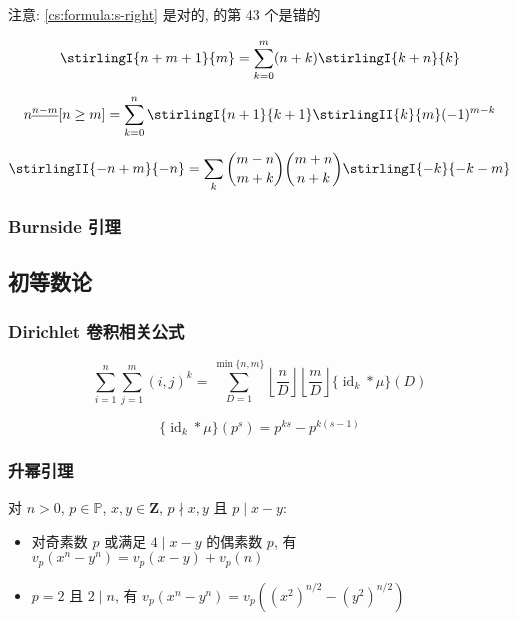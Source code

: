 注意: \eqref{cs:formula:s-right} 是对的,  的第 43 个是错的

\begin{equation}
    \label{cs:formula:s-right}
    \stirlingI{n+m+1}{m}=\sum_{k=0}^m(n+k)\stirlingI{k+n}{k}
\end{equation}

\begin{equation}
    n^{\underline{n-m}}[n\geq m]=\sum_{k=0}^n\stirlingI{n+1}{k+1}\stirlingII{k}{m}(-1)^{m-k}
\end{equation}

\begin{equation}
    \stirlingII{-n+m}{-n}=\sum_k\binom{m-n}{m+k}\binom{m+n}{n+k}\stirlingI{-k}{-k-m}
\end{equation}

\subsubsection{Burnside 引理}


\subsection{初等数论}

\subsubsection{Dirichlet 卷积相关公式}

\begin{equation}
    \sum_{i=1}^n\sum_{j=1}^m(i,j)^k=\sum_{D=1}^{\min\{n,m\}}\left\lfloor\frac{n}{D}\right\rfloor\left\lfloor\frac{m}{D}\right\rfloor\{\operatorname{id}_k*\mu\}(D)
\end{equation}

\begin{equation}
    \{\operatorname{id}_k*\mu\}(p^s)=p^{ks}-p^{k(s-1)}
\end{equation}

\subsubsection{升幂引理}

对 \(n>0\), \(p\in\mathbb{P}\), \(x,y\in\mathbf{Z}\), \(p\nmid x,y\) 且 \(p\mid x-y\):

\begin{itemize}
    \item 对奇素数 \(p\) 或满足 \(4\mid x-y\) 的偶素数 \(p\), 有 \(v_p\left(x^n-y^n\right)=v_p(x-y)+v_p(n)\)
    \item \(p=2\) 且 \(2\mid n\), 有 \(v_p\left(x^n-y^n\right)=v_p\left(\left(x^2\right)^{n/2}-\left(y^2\right)^{n/2}\right)\)
\end{itemize}

